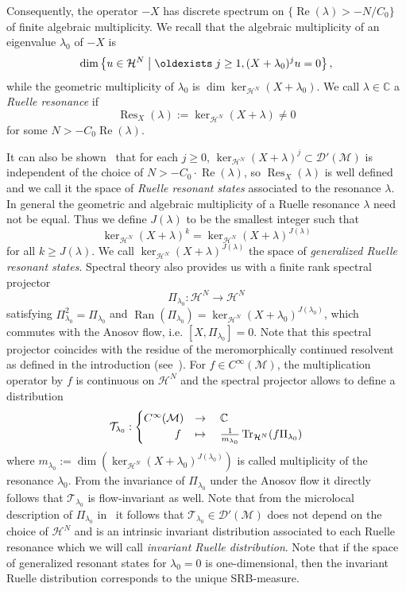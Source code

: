 \documentclass[10pt]{amsart}
\theoremstyle{definition}
\DeclareMathOperator{\Tr}{Tr}
\DeclareMathOperator{\Res}{Res}
\DeclareMathOperator{\Real}{Re}
\DeclareMathOperator{\Ran}{Ran}
\newcommand{\mc}{\mathcal}
\newcommand{\cc}{\mathbb{C}}
\newcommand{\la}{\lambda}
\let\Re=\Real
\renewcommand{\Re}{\operatorname{Re}}
\renewcommand*{\exists}{\mathrel{\oldexists}}
\begin{document}
Consequently, the operator $-X$ has discrete spectrum on $\{\Re(\lambda)>-N/C_0\}$ of finite algebraic multiplicity. We recall that the algebraic multiplicity of an eigenvalue $\la_0$ of $-X$ is
\[
\dim \left\{u\in \mc{H}^N\;\middle|\; \exists j\geq 1, (X+\la_0)^ju=0\right\},
\]
while the geometric multiplicity of $\la_0$ is $\dim \ker_{\mc{H}^N}(X+\la_0)$. We call $\lambda \in \cc$ a \emph{Ruelle resonance} if
\[
\Res_{X}(\lambda) := \ker_{\mc{H}^N}(X+\lambda) \neq 0
\]
for some $N> -C_0\Re(\lambda)$.

It can also be shown~\cite[Theorem~1.5]{FSj11} that for each $j\geq 0$, $\ker_{\mc{H}^N}(X+\lambda)^j\subset \mathcal D'(\mathcal M)$ is independent of the choice of $N> -C_0\cdot \Re(\lambda)$, so $\Res_{X}(\lambda)$ is well defined and we call it the space of \emph{Ruelle resonant states} associated to the resonance $\lambda$. In general the geometric and algebraic multiplicity of a Ruelle resonance $\lambda$ need not be equal. Thus we define $J(\lambda)$ to be the smallest integer such that
\[
\ker_{\mc{H}^N}(X+\lambda)^k = \ker_{\mc{H}^N}(X+\lambda)^{J(\lambda)}
\]
for all $k\geq J(\lambda)$. We call $\ker_{\mc{H}^N}(X+\lambda)^{J(\lambda)}$ the space of \emph{generalized Ruelle resonant states}. Spectral theory also provides us with a finite rank spectral projector
\[
\Pi_{\lambda_0} : \mc{H}^N \to \mc{H}^N
\]
satisfying $\Pi_{\lambda_0}^2= \Pi_{\lambda_0}$ and $\Ran(\Pi_{\lambda_0})=\ker_{\mc{H}^N}(X+\lambda_0)^{J(\lambda_0)}$, which commutes with the Anosov flow, i.e. $[X,\Pi_{\lambda_0}] = 0$. Note that this spectral projector coincides with the residue of the meromorphically continued resolvent as defined in the introduction (see~\cite[Section~4]{DZ16}). For $f\in C^\infty(\mathcal M)$, the multiplication operator by $f$ is continuous on $\mc{H}^N$ and the spectral projector allows to define a distribution
\begin{equation}\label{eq:inv_ruelle_dist}
\mathcal T_{\lambda_0}:
\begin{cases}
C^\infty (\mc{M})& \rightarrow\quad\cc\\
\mkern 50mu f & \mapsto\quad\frac{1}{m_{\lambda_0}}\Tr_{\mc{H}^N}(f\Pi_{\lambda_0})
\end{cases}
\end{equation}
where $m_{\lambda_0} := \dim(\ker_{\mc{H}^N}(X+\lambda_0)^{J(\lambda_0)})$ is called multiplicity of the resonance $\la_0$. From the invariance of $\Pi_{\lambda_0}$ under the Anosov flow it directly follows that $\mathcal T_{\lambda_0}$ is flow-invariant as well. Note that from the microlocal description of $\Pi_{\lambda_0}$ in~\cite{DZ16} it follows that $\mathcal T_{\lambda_0} \in \mc{D}'(\mathcal M)$ does not depend on the choice of $\mc{H}^N$ and is an intrinsic invariant distribution associated to each Ruelle resonance which we will call \emph{invariant Ruelle distribution}. Note that if the space of generalized resonant states for $\lambda_0=0$ is one-dimensional, then the invariant Ruelle distribution corresponds to the unique SRB-measure.
\end{document}

